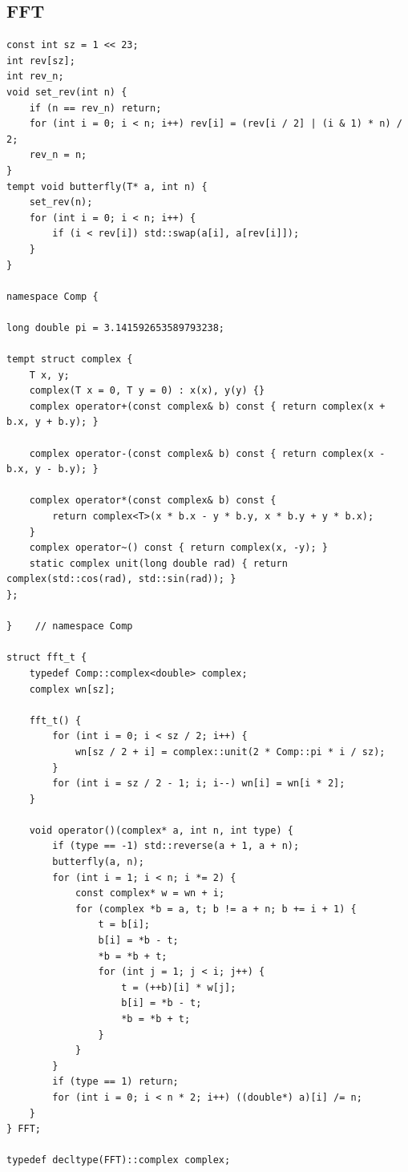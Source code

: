 \documentclass[UTF8, a4paper, titlepage, twoside]{ctexart}
\begin{document}
\subsection{ FFT }
\begin{lstlisting}[style=cpp]
const int sz = 1 << 23;
int rev[sz];
int rev_n;
void set_rev(int n) {
    if (n == rev_n) return;
    for (int i = 0; i < n; i++) rev[i] = (rev[i / 2] | (i & 1) * n) / 2;
    rev_n = n;
}
tempt void butterfly(T* a, int n) {
    set_rev(n);
    for (int i = 0; i < n; i++) {
        if (i < rev[i]) std::swap(a[i], a[rev[i]]);
    }
}

namespace Comp {

long double pi = 3.141592653589793238;

tempt struct complex {
    T x, y;
    complex(T x = 0, T y = 0) : x(x), y(y) {}
    complex operator+(const complex& b) const { return complex(x + b.x, y + b.y); }

    complex operator-(const complex& b) const { return complex(x - b.x, y - b.y); }

    complex operator*(const complex& b) const {
        return complex<T>(x * b.x - y * b.y, x * b.y + y * b.x);
    }
    complex operator~() const { return complex(x, -y); }
    static complex unit(long double rad) { return complex(std::cos(rad), std::sin(rad)); }
};

}    // namespace Comp

struct fft_t {
    typedef Comp::complex<double> complex;
    complex wn[sz];

    fft_t() {
        for (int i = 0; i < sz / 2; i++) {
            wn[sz / 2 + i] = complex::unit(2 * Comp::pi * i / sz);
        }
        for (int i = sz / 2 - 1; i; i--) wn[i] = wn[i * 2];
    }

    void operator()(complex* a, int n, int type) {
        if (type == -1) std::reverse(a + 1, a + n);
        butterfly(a, n);
        for (int i = 1; i < n; i *= 2) {
            const complex* w = wn + i;
            for (complex *b = a, t; b != a + n; b += i + 1) {
                t = b[i];
                b[i] = *b - t;
                *b = *b + t;
                for (int j = 1; j < i; j++) {
                    t = (++b)[i] * w[j];
                    b[i] = *b - t;
                    *b = *b + t;
                }
            }
        }
        if (type == 1) return;
        for (int i = 0; i < n * 2; i++) ((double*) a)[i] /= n;
    }
} FFT;

typedef decltype(FFT)::complex complex;

\end{lstlisting}
\end{document}
